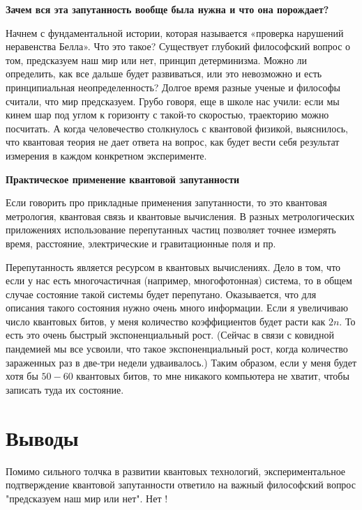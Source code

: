 \documentclass[a4paper, 12pt]{article}%
\begin{document}
\textbf{Зачем вся эта запутанность вообще была нужна и что она порождает?}

Начнем с фундаментальной истории, которая называется «проверка нарушений неравенства Белла». Что это такое? Существует глубокий философский вопрос о том, предсказуем наш мир или нет, принцип детерминизма. Можно ли определить, как все дальше будет развиваться, или это невозможно и есть принципиальная неопределенность? Долгое время разные ученые и философы считали, что мир предсказуем. Грубо говоря, еще в школе нас учили: если мы кинем шар под углом к горизонту с такой-то скоростью, траекторию можно посчитать. А когда человечество столкнулось с квантовой физикой, выяснилось, что квантовая теория не дает ответа на вопрос, как будет вести себя результат измерения в каждом конкретном эксперименте.

\textbf{Практическое применение квантовой запутанности}

Если говорить про прикладные применения запутанности, то это квантовая метрология, квантовая связь и квантовые вычисления. В разных метрологических приложениях использование перепутанных частиц позволяет точнее измерять время, расстояние, электрические и гравитационные поля и пр.

Перепутанность является ресурсом в квантовых вычислениях. Дело в том, что если у нас есть многочастичная (например, многофотонная) система, то в общем случае состояние такой системы будет перепутано. Оказывается, что для описания такого состояния нужно очень много информации. Если я увеличиваю число квантовых битов, у меня количество коэффициентов будет расти как $2n$. То есть это очень быстрый экспоненциальный рост. (Сейчас в связи с ковидной пандемией мы все усвоили, что такое экспоненциальный рост, когда количество зараженных раз в две-три недели удваивалось.) Таким образом, если у меня будет хотя бы $50-60$ квантовых битов, то мне никакого компьютера не хватит, чтобы записать туда их состояние.

\section{Выводы}

Помимо сильного толчка в развитии квантовых технологий, экспериментальное подтверждение квантовой запутанности ответило на важный философский вопрос "предсказуем наш мир или нет". Нет ! 
\end{document}
